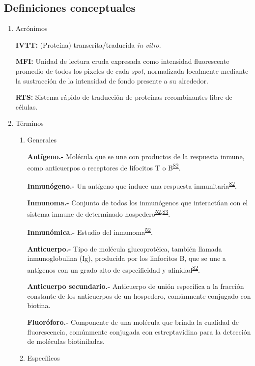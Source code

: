 \documentclass[]{article}
\begin{document}
\subsection{Definiciones conceptuales}\label{definiciones-conceptuales}

\begin{enumerate}
\def\labelenumi{\alph{enumi}.}
\item
  Acrónimos

  \textbf{IVTT:} (Proteína) transcrita/traducida \emph{in vitro}.

  \textbf{MFI:} Unidad de lectura cruda expresada como intensidad
  fluorescente promedio de todos los pixeles de cada \emph{spot},
  normalizada localmente mediante la sustracción de la intensidad de
  fondo presente a su alrededor.

  \textbf{RTS:} Sistema rápido de traducción de proteínas recombinantes
  libre de células.
\item
  Términos

  \begin{enumerate}
  \def\labelenumii{\roman{enumii}.}
  \item
    Generales

    \textbf{Antígeno.-} Molécula que se une con productos de la
    respuesta inmune, como anticuerpos o receptores de lifocitos T o
    B\textsuperscript{\protect\hyperlink{ref-abbas2012}{82}}.

    \textbf{Inmunógeno.-} Un antígeno que induce una respuesta
    inmunitaria\textsuperscript{\protect\hyperlink{ref-abbas2012}{82}}.

    \textbf{Inmunoma.-} Conjunto de todos los inmunógenos que
    interactúan con el sistema inmune de determinado
    hospedero\textsuperscript{\protect\hyperlink{ref-immunomics2016}{52},\protect\hyperlink{ref-sette2005}{83}}.

    \textbf{Inmunómica.-} Estudio del
    inmunoma\textsuperscript{\protect\hyperlink{ref-immunomics2016}{52}}.

    \textbf{Anticuerpo.-} Tipo de molécula glucoprotéica, también
    llamada inmunoglobulina (Ig), producida por los linfocitos B, que se
    une a antígenos con un grado alto de especificidad y
    afinidad\textsuperscript{\protect\hyperlink{ref-abbas2012}{82}}.

    \textbf{Anticuerpo secundario.-} Anticuerpo de unión específica a la
    fracción constante de los anticuerpos de un hospedero, comúnmente
    conjugado con biotina.

    \textbf{Fluoróforo.-} Componente de una molécula que brinda la
    cualidad de fluorescencia, comúnmente conjugada con estreptavidina
    para la detección de moléculas biotiniladas.
  \item
    Específicos


\end{enumerate}
\end{enumerate}
\end{document}
